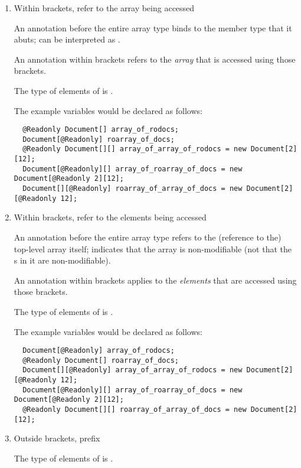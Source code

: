 \begin{enumerate}
  \item{Within brackets, refer to the array being accessed}

An annotation before the entire array type binds to the member type that it
abuts;
 can be interpreted as
.

An annotation within brackets refers to the \emph{array} that is accessed
using those brackets.

The type of elements of  is .

The example variables would be declared as follows:

\begin{Verbatim}
  @Readonly Document[] array_of_rodocs;
  Document[@Readonly] roarray_of_docs;
  @Readonly Document[][] array_of_array_of_rodocs = new Document[2][12];
  Document[@Readonly][] array_of_roarray_of_docs = new Document[@Readonly 2][12];
  Document[][@Readonly] roarray_of_array_of_docs = new Document[2][@Readonly 12];
\end{Verbatim}

  \item{Within brackets, refer to the elements being accessed}

An annotation before the entire array type refers to the (reference to the)
top-level array
itself;  indicates that the array is
non-modifiable (not that the s in it are non-modifiable).

An annotation within brackets applies to the \emph{elements} that are
accessed using those brackets.

The type of elements of  is .

The example variables would be declared as follows:

\begin{Verbatim}
  Document[@Readonly] array_of_rodocs;
  @Readonly Document[] roarray_of_docs;
  Document[][@Readonly] array_of_array_of_rodocs = new Document[2][@Readonly 12];
  Document[@Readonly][] array_of_roarray_of_docs = new Document[@Readonly 2][12];
  @Readonly Document[][] roarray_of_array_of_docs = new Document[2][12];
\end{Verbatim}

  \item{Outside brackets, prefix}

The type of elements of  is .


\end{enumerate}
